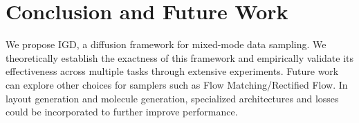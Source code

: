 \section{Conclusion and Future Work}
\label{sec:conclusion}
We propose IGD, a diffusion framework for mixed-mode data sampling. We theoretically establish the exactness of this framework and empirically validate its effectiveness across multiple tasks through extensive experiments. Future work can explore other choices for samplers such as Flow Matching/Rectified Flow. In layout generation and molecule generation, specialized architectures and losses could be incorporated to further improve performance.
